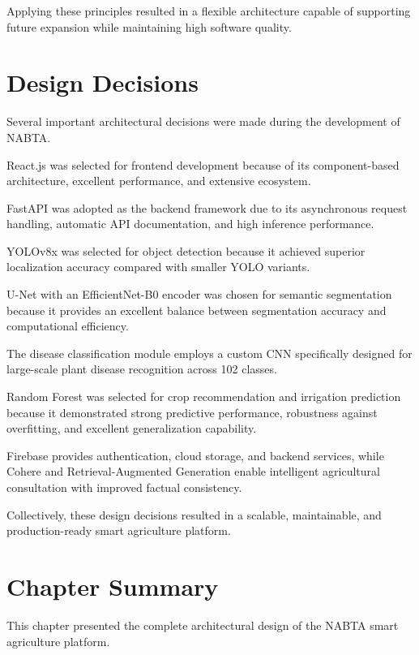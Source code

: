 Applying these principles resulted in a flexible architecture capable of supporting future expansion while maintaining high software quality.

\section{Design Decisions}
\label{sec:design_decisions}

Several important architectural decisions were made during the development of NABTA.

React.js was selected for frontend development because of its component-based architecture, excellent performance, and extensive ecosystem.

FastAPI was adopted as the backend framework due to its asynchronous request handling, automatic API documentation, and high inference performance.

YOLOv8x was selected for object detection because it achieved superior localization accuracy compared with smaller YOLO variants.

U-Net with an EfficientNet-B0 encoder was chosen for semantic segmentation because it provides an excellent balance between segmentation accuracy and computational efficiency.

The disease classification module employs a custom CNN specifically designed for large-scale plant disease recognition across 102 classes.

Random Forest was selected for crop recommendation and irrigation prediction because it demonstrated strong predictive performance, robustness against overfitting, and excellent generalization capability.

Firebase provides authentication, cloud storage, and backend services, while Cohere and Retrieval-Augmented Generation enable intelligent agricultural consultation with improved factual consistency.

Collectively, these design decisions resulted in a scalable, maintainable, and production-ready smart agriculture platform.

\section{Chapter Summary}
\label{sec:chapter4_summary}

This chapter presented the complete architectural design of the NABTA smart agriculture platform.

